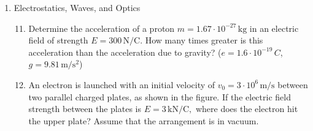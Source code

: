 \documentclass[a4paper,12pt]{letter}
\begin{document}
\begin{enumerate}[label=\Roman*.]
\begin{enumerate}[label=\arabic*.]
\item What is the entropy change if the volume of $ m = 2\,\mathrm{g} $ of hydrogen changes from $ V_1 = 30\,\mathrm{l} \text{\ to\ } V_2 = 120\,\mathrm{l},$ and its temperature changes from $t_1 = 80^\circ\mathrm{C} \text{\ to\ } t_2 = 400^\circ\mathrm{C}$? The molar mass is $ M = 2\,\mathrm{g/mol}$, $R=8.31\,\frac{J}{mol\cdot K}$.
  
\end{enumerate}
  

\item Electrostatics, Waves, and Optics

\begin{enumerate}[label=\arabic*.]
\setcounter{enumii}{10} %

\item Determine the acceleration of a proton $ m = 1.67 \cdot 10^{-27}\,\mathrm{kg} $ in an electric field of strength $ E = 300\,\mathrm{N/C}. $ How many times greater is this acceleration than the acceleration due to gravity? ($e=1.6\cdot 10^{-19}\,C$, $g=9.81\,\mathrm{m/s^{2}}$) 


\item An electron is launched with an initial velocity of $ v_0 = 3\cdot 10^6\,\mathrm{m/s} $ between two parallel charged plates, as shown in the figure. If the electric field strength between the plates is $ E = 3\,\mathrm{kN/C}, $ where does the electron hit the upper plate? Assume that the arrangement is in vacuum.

\begin{center}
\end{center}
\end{enumerate}
\end{enumerate}
\end{document}
